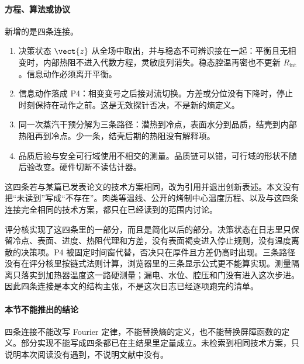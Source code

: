 \paragraph{方程、算法或协议}
新增的是四条连接。

\begin{enumerate}
\item 决策状态 $\vect{z}$ 从全场中取出，并与稳态不可辨识接在一起：平衡且无相变时，内部热阻不进入代数方程，灵敏度列消失。稳态腔温再密也不更新 $R_{\mathrm{int}}$。信息动作必须离开平衡。
\item 信息动作落成 P4：相变变号之后接对流切换。方差或分位没有下降时，停止时刻保持在动作之前。这是无效探针否决，不是新的熵定义。
\item 同一次蒸汽干预分解为三条路径：潜热到冷点，表面水分到品质，结壳到内部热阻再到冷点。少一条，结壳后期的热阻没有解释项。
\item 品质后验与安全可行域使用不相交的测量。品质链可以错，可行域的形状不随后验改变。硬件切断不读估计器。
\end{enumerate}

这四条若与某篇已发表论文的技术方案相同，改为引用并退出创新表述。本文没有把“未读到”写成“不存在”。肉类等温线、公开的烤制中心温度历程、以及与这四条连接完全相同的技术方案，都只在已经读到的范围内讨论。

评分核实现了这四条里的一部分，而且是简化以后的部分。决策状态在日志里只保留冷点、表面、进度、热阻代理和方差，没有表面褐变进入停止规则，没有温度离散的决策项。P4 被固定时间窗代替，否决只在厚件且方差仍高时出现。三条路径没有在评分核里按链式法则计算，浏览器里的三条显示公式更不能算实现。测量隔离只落实到加热器温度这一路硬测量；漏电、水位、腔压和门没有进入这次步进。因此四条连接是本文的结构主张，不是这次日志已经逐项跑完的清单。

\paragraph{本节不能推出的结论}
四条连接不能改写 Fourier 定律，不能替换熵的定义，也不能替换屏障函数的定义。部分实现不能写成四条都已在主结果里定量成立。未检索到相同技术方案，只说明本次阅读没有遇到，不说明文献中没有。
